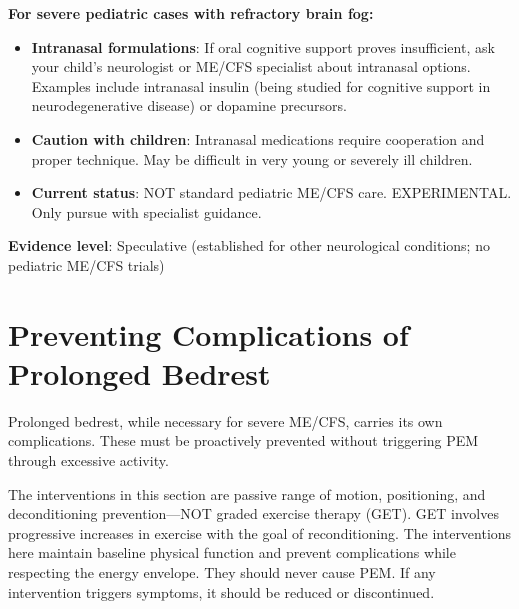 \begin{recommendation}
\label{rec:intranasal-ped-severe}

\textbf{For severe pediatric cases with refractory brain fog:}

\begin{itemize}
    \item \textbf{Intranasal formulations}: If oral cognitive support proves insufficient, ask your child's neurologist or ME/CFS specialist about intranasal options. Examples include intranasal insulin (being studied for cognitive support in neurodegenerative disease) or dopamine precursors.

    \item \textbf{Caution with children}: Intranasal medications require cooperation and proper technique. May be difficult in very young or severely ill children.

    \item \textbf{Current status}: NOT standard pediatric ME/CFS care. EXPERIMENTAL. Only pursue with specialist guidance.
\end{itemize}

\textbf{Evidence level}: Speculative (established for other neurological conditions; no pediatric ME/CFS trials)

\end{recommendation}

\section{Preventing Complications of Prolonged Bedrest}
\label{sec:ped-bedrest-complications}

Prolonged bedrest, while necessary for severe ME/CFS, carries its own complications. These must be proactively prevented without triggering PEM through excessive activity.

\begin{practicalwarning}
The interventions in this section are passive range of motion, positioning, and deconditioning prevention---NOT graded exercise therapy (GET). GET involves progressive increases in exercise with the goal of reconditioning. The interventions here maintain baseline physical function and prevent complications while respecting the energy envelope. They should never cause PEM. If any intervention triggers symptoms, it should be reduced or discontinued.
\end{practicalwarning}

